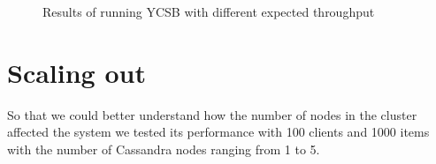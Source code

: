 \begin{figure}[!ht]
  \begin{center}\end{center}
  \label{fig:ycsb}
  \caption{Results of running YCSB with different expected throughput}
\end{figure}


\section{Scaling out}

So that we could better understand how the number of nodes in the cluster affected the system we tested its performance with 100 clients and 1000 items with the number of Cassandra nodes ranging from 1 to 5.  



